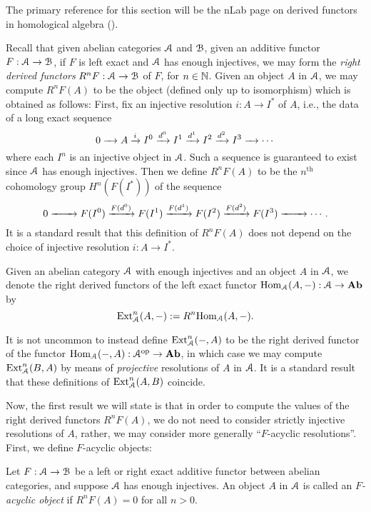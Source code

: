 \documentclass[../main.tex]{subfiles}
\begin{document}
The primary reference for this section will be the nLab page on derived functors in homological algebra (\cite{nlab:derived_functor_in_homological_algebra}).

Recall that given abelian categories $\mathcal A$ and $\mathcal B$, given an additive functor $F:\mathcal A\to\mathcal B$, if $F$ is left exact and $\mathcal A$ has enough injectives, we may form the \emph{right derived functors} $R^nF:\mathcal A\to\mathcal B$ of $F$, for $n\in\mathbb{N}$. Given an object $A$ in $\mathcal A$, we may compute $R^nF(A)$ to be the object (defined only up to isomorphism) which is obtained as follows: First, fix an injective resolution $i:A\to I^*$ of $A$, i.e., the data of a long exact sequence
\[0\xrightarrow{\phantom{d^2}}A\xrightarrow{i}I^0\xrightarrow{d^0}I^1\xrightarrow{d^1}I^2\xrightarrow{d^2}I^3\xrightarrow{\phantom{d^2}}\cdots\]
where each $I^n$ is an injective object in $\mathcal A$. Such a sequence is guaranteed to exist since $\mathcal A$ has enough injectives. Then we define $R^nF(A)$ to be the $n^\text{th}$ cohomology group $H^n(F(I^*))$ of the sequence
\[0\xrightarrow{\phantom{F(d^2)}}F(I^0)\xrightarrow{F(d^0)}F(I^1)\xrightarrow{F(d^1)}F(I^2)\xrightarrow{F(d^2)}F(I^3)\xrightarrow{\phantom{F(d^2)}}\cdots.\]
It is a standard result that this definition of $R^nF(A)$ does not depend on the choice of injective resolution $i:A\to I^*$. 

\begin{definition}\label{defn:Ext}
	Given an abelian category $\mathcal A$ with enough injectives and an object $A$ in $\mathcal A$, we denote the right derived functors of the left exact functor $\mathrm{Hom}_\mathcal A(A,-):\mathcal A\to\mathbf{Ab}$ by
	\[\mathrm{Ext}^n_\mathcal A(A,-):=R^n\mathrm{Hom}_\mathcal A(A,-).\]
\end{definition}

\begin{remark}
	It is not uncommon to instead define $\mathrm{Ext}^n_\mathcal A(-,A)$ to be the right derived functor of the functor $\mathrm{Hom}_\mathcal A(-,A):\mathcal A^{\mathrm{op}}\to\mathbf{Ab}$, in which case we may compute $\mathrm{Ext}^n_\mathcal A(B,A)$ by means of \emph{projective} resolutions of $A$ in $\mathcal A$. It is a standard result that these definitions of $\mathrm{Ext}^n_\mathcal A(A,B)$ coincide.
\end{remark}

Now, the first result we will state is that in order to compute the values of the right derived functors $R^nF(A)$, we do not need to consider strictly injective resolutions of $A$, rather, we may consider more generally ``$F$-acyclic resolutions''. First, we define $F$-acyclic objects:

\begin{definition}\label{defn:acyclic_object}
	Let $F:\mathcal A\to\mathcal B$ be a left or right exact additive functor between abelian categories, and suppose $\mathcal A$ has enough injectives. An object $A$ in $\mathcal A$ is called an \emph{$F$-acyclic object} if $R^nF(A)=0$ for all $n>0$.
\end{definition}
\end{document}
